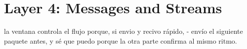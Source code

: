 
\chapter{Layer 4: Messages and Streams}

la ventana controla el flujo porque, si envio y recivo rápido, - envío el siguiente paquete antes, y sé que puedo porque la otra parte confirma al mismo ritmo.
